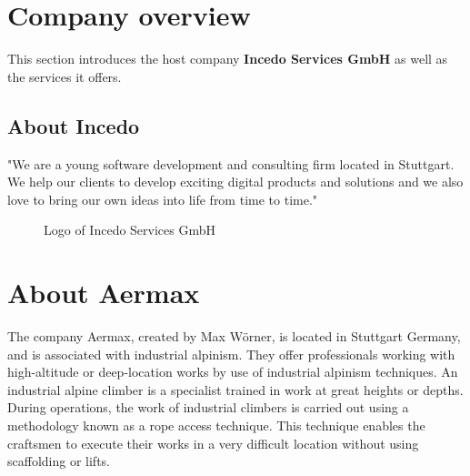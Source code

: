 \section{Company overview}
This section introduces the host company {\bf Incedo Services GmbH} as well as the services it offers.
\subsection{About Incedo}
"We are a young software development and consulting firm located in Stuttgart.
We help our clients to develop exciting digital products and solutions and we also love to bring our own ideas into life from time to time." \cite{logo-of-incedo}
\begin{figure}[H]
    \centering
    \caption{Logo of Incedo Services GmbH}
    \label{fig:logo-of-incedo}
\end{figure}

\section{About Aermax}

The company Aermax, created by Max Wörner, is located in Stuttgart Germany, and is associated with industrial alpinism. They offer professionals working with high-altitude or deep-location works by use of industrial alpinism techniques. An industrial alpine climber is a specialist trained in work at great heights or depths. During operations, the work of industrial climbers is carried out using a methodology known as a rope access technique. This technique enables the craftsmen to execute their works in a very difficult location without using scaffolding or lifts.


